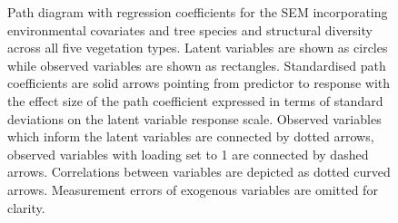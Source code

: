 \documentclass[11pt,a4paper]{article}
\begin{document}
\begin{figure}[H]
\centering
	
	\caption{Path diagram with regression coefficients for the SEM incorporating environmental covariates and tree species and structural diversity across all five vegetation types. Latent variables are shown as circles while observed variables are shown as rectangles. Standardised path coefficients are solid arrows pointing from predictor to response with the effect size of the path coefficient expressed in terms of standard deviations on the latent variable response scale. Observed variables which inform the latent variables are connected by dotted arrows, observed variables with loading set to 1 are connected by dashed arrows. Correlations between variables are depicted as dotted curved arrows. Measurement errors of exogenous variables are omitted for clarity.}
	\label{full_mod}
\end{figure}


% 
% 
% 
% 
\end{document}
